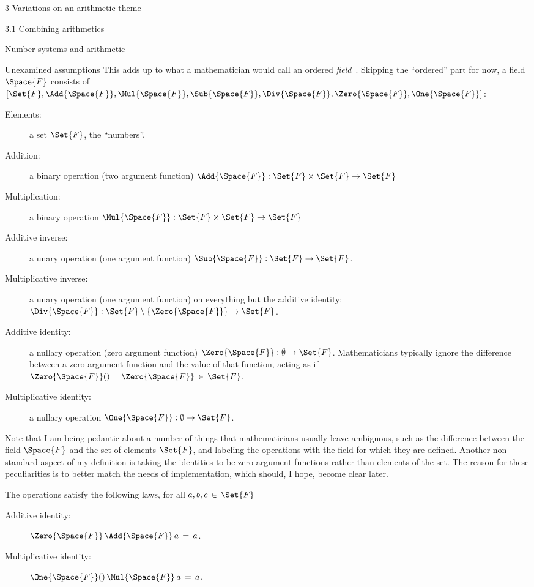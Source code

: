 \documentclass[12pt]{PalisadesLakesBook}
\begin{document}
\begin{plSection}{3 Variations on an arithmetic theme}
\begin{plSection}{3.1 Combining arithmetics}
\begin{plSection}{Number systems and arithmetic}
\begin{plSection}{Unexamined assumptions}
This adds up to what a mathematician would call an ordered 
\emph{field}~\cite{wiki:FieldMathematics}.
Skipping the ``ordered'' part for now,
a field $\Space{F}$ consists of
$[\Set{F},\Add{\Space{F}},\Mul{\Space{F}},
\Sub{\Space{F}},\Div{\Space{F}},\Zero{\Space{F}}, \One{\Space{F}}]$:
\begin{description}
\item[Elements:] a set $\Set{F}$, the ``numbers''.
\item[Addition:] a binary operation (two argument function)
$\Add{\Space{F}} : \Set{F} \times \Set{F} \rightarrow \Set{F}$
\item[Multiplication:] a binary operation 
$\Mul{\Space{F}} : \Set{F} \times \Set{F} \rightarrow \Set{F}$
\item[Additive inverse:] a unary operation (one argument function)
$\Sub{\Space{F}} :\Set{F} \rightarrow \Set{F}$.
\item[Multiplicative inverse:] 
a unary operation (one argument function)
on everything but the additive identity:
$\Div{\Space{F}} :  \Set{F} \setminus \left\{\Zero{\Space{F}}\right\} 
\rightarrow \Set{F}$.
\item[Additive identity:] a nullary operation 
(zero argument function)
$\Zero{\Space{F}} : \emptyset \rightarrow \Set{F}$.
Mathematicians typically ignore the difference between a zero
argument function and the value of that function,
acting as if $\Zero{\Space{F}}() = \Zero{\Space{F}}\, \in \, \Set{F}$.
\item[Multiplicative identity:] a nullary operation 
$\One{\Space{F}} : \emptyset \rightarrow \Set{F}$.
\end{description}
Note that I am being pedantic about a number of things
that mathematicians usually leave ambiguous,
such as the difference between the field $\Space{F}$ 
and the set of elements $\Set{F}$,
and labeling the operations
with the field for which they are defined.
Another non-standard aspect of my definition is taking
the identities to be zero-argument functions rather than
elements of the set.
The reason for these peculiarities is to better match the needs 
of implementation, which should, I hope, 
become clear later.

The operations satisfy the following laws, for all 
$a, b, c \,\in \, \Set{F}$
\begin{description}

\item[Additive identity:] 
$\Zero{\Space{F}} \,\Add{\Space{F}}\, a \,=\, a$.

\item[Multiplicative identity:] 
$\One{\Space{F}}() \,\Mul{\Space{F}}\, a \,=\, a$.


\end{description}
\end{plSection}
\end{plSection}
\end{plSection}
\end{plSection}
\end{document}
